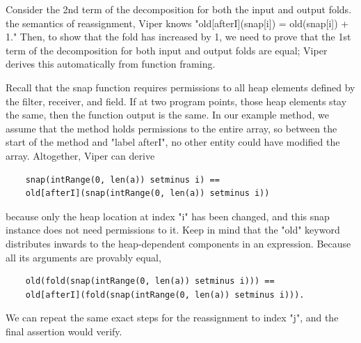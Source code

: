 \documentclass[msc,oneside]{ubcthesis}
\theoremstyle{definition}
\begin{document}
Consider the 2nd term of the decomposition for both the input and output folds. the semantics of reassignment, Viper knows "old[afterI](snap[i]) = old(snap[i]) + 1." Then, to show that the fold has increased by 1, we need to prove that the 1st term of the decomposition for both input and output folds are equal; Viper derives this automatically from function framing.

Recall that the snap function requires permissions to all heap elements defined by the filter, receiver, and field. If at two program points, those heap elements stay the same, then the function output is the same. In our example method, we assume that the method holds permissions to the entire array, so between the start of the method and "label afterI", no other entity could have modified the array. Altogether, Viper can derive 
\begin{lstlisting}
    snap(intRange(0, len(a)) setminus i) == 
    old[afterI](snap(intRange(0, len(a)) setminus i))
\end{lstlisting}
because only the heap location at index "i" has been changed, and this snap instance does not need permissions to it. Keep in mind that the "old" keyword distributes inwards to the heap-dependent components in an expression. 
Because all its arguments are provably equal, 
\begin{lstlisting}
    old(fold(snap(intRange(0, len(a)) setminus i))) == 
    old[afterI](fold(snap(intRange(0, len(a)) setminus i))).
\end{lstlisting}

We can repeat the same exact steps for the reassignment to index "j", and the final assertion would verify.
\end{document}

